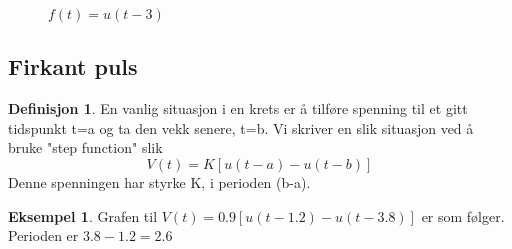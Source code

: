 \documentclass[11pt]{article}
\theoremstyle{definition}
\newtheorem{mindef}{Definisjon}[section]
\newenvironment{fmindef}
{\begin{mdframed}[style=minstil]\begin{mindef}}
		{\end{mindef}\end{mdframed}}
\theoremstyle{definition}
\newtheorem{mitteks}{Eksempel}[section]
\theoremstyle{definition}
\theoremstyle{definition}
\theoremstyle{definition}
\theoremstyle{definition}
\begin{document}
						\begin{figure}[!ht]
							\centering
							\caption{\(f(t)=u(t-3)\)}
						\end{figure}
						
		\newpage
		\subsection{Firkant puls}
		
		\begin{fmindef}
		En vanlig situasjon i en krets er å tilføre spenning til et gitt tidspunkt t=a og ta den vekk senere, t=b. Vi skriver en slik situasjon ved å bruke "step function" slik \[V(t)=K[u(t-a)-u(t-b)]\] Denne spenningen har styrke K, i perioden (b-a).	
		\end{fmindef}
		
		\begin{mitteks}
			Grafen til \(V(t)=0.9[u(t-1.2)-u(t-3.8)]\) er som følger. Perioden er \(3.8-1.2=2.6\)
		\end{mitteks}
		
\end{document}
